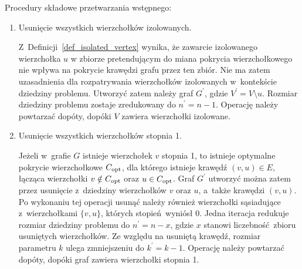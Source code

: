 Procedury składowe przetwarzania wstępnego:
\begin{enumerate}
  \item Usunięcie wszystkich wierzchołków izolowanych.

    Z~Definicji~\ref{def_isolated_vertex} wynika, że zawarcie izolowanego wierzchołka $u$ w zbiorze pretendującym do miana pokrycia wierzchołkowego nie wpływa na pokrycie krawędzi grafu przez ten zbiór.
    Nie ma zatem uzasadnienia dla rozpatrywania wierzchołków izolowanych w~kontekście dziedziny problemu.
    Utworzyć zatem należy graf $G^\prime$, gdzie $V^\prime = V \setminus u$.
    Rozmiar dziedziny problemu zostaje zredukowany do $n^\prime=n-1$.
    Operację należy powtarzać dopóty, dopóki $V$ zawiera wierzchołki izolowane.

  \item Usunięcie wszystkich wierzchołków stopnia 1.

    Jeżeli w~grafie $G$ istnieje wierzchołek $v$ stopnia 1, to istnieje optymalne pokrycie wierzchołkowe $C_{\textnormal{opt}}$, dla którego istnieje krawędź $(v,u) \in E$, łącząca wierzchołki $v \notin C_{\textnormal{opt}}$ oraz $u \in C_{\textnormal{opt}}$.
    Graf $G^\prime$ utworzyć można zatem przez usunięcie z~dziedziny wierzchołków $v$ oraz
    $u$, a~także krawędzi $(v,u)$.
    Po wykonaniu tej operacji usunąć należy również wierzchołki sąsiadujące z~wierzchołkami
    $\{v,u\}$, których stopień~wyniósł 0.
    Jedna iteracja redukuje rozmiar dziedziny problemu do $n^\prime=n-x$, gdzie
    $x$ stanowi liczebność~zbioru usuniętych wierzchołków.
    Ze względu na usuniętą krawędź, rozmiar parametru $k$ ulega zmniejszeniu do
    $k^\prime=k-1$.
    Operację należy powtarzać dopóty, dopóki graf zawiera wierzchołki stopnia 1.


\end{enumerate}
